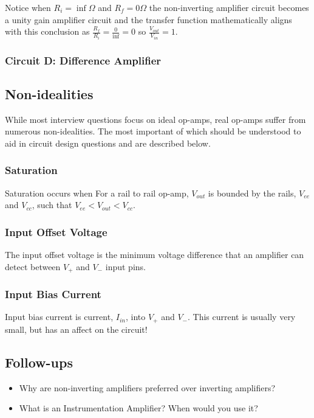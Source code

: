 \documentclass[main.tex]{subfiles}
\begin{document}
Notice when $R_i = \inf \Omega$ and $R_f = 0 \Omega$ the non-inverting amplifier circuit becomes a unity gain amplifier circuit and the transfer function mathematically aligns with this conclusion as $\frac{R_f}{R_i} = \frac{0}{\inf} = 0$ so $\frac{V_{out}}{V_{in}} = 1$. 

\subsubsection{Circuit D: Difference Amplifier}


\subsection{Non-idealities}
While most interview questions focus on ideal op-amps, real op-amps suffer from numerous non-idealities. The most important of which should be understood to aid in circuit design questions and are described below. 

\subsubsection{Saturation}
Saturation occurs when 
For a rail to rail op-amp, $V_{out}$ is bounded by the rails, $V_{ee}$ and $V_{cc}$, such that $V_{ee} < V_{out} < V_{cc}$. 

\subsubsection{Input Offset Voltage}
The input offset voltage is the minimum voltage difference that an amplifier can detect between $V_{+}$ and $V_{-}$ input pins. 

\subsubsection{Input Bias Current}
Input bias current is current, $I_{in}$, into $V_{+}$ and $V_{-}$. This current is usually very small, but has an affect on the circuit! 

\subsection{Follow-ups}
\begin{itemize}
    \item Why are non-inverting amplifiers preferred over inverting amplifiers? %
    \item What is an Instrumentation Amplifier? When would you use it? %
\end{itemize}
\end{document}
